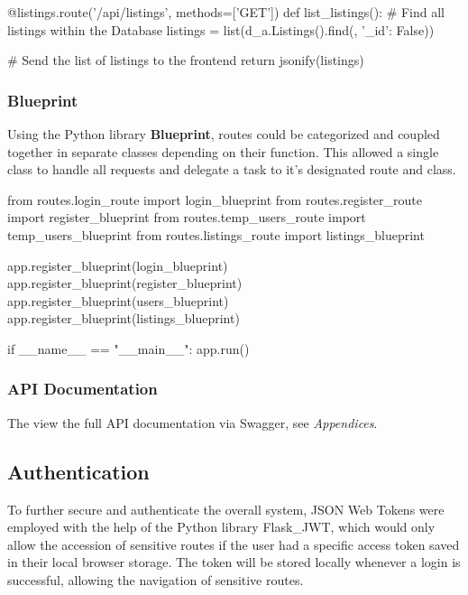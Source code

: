 \begin{python}[caption=API Counterpart Route]
@listings.route('/api/listings', methods=['GET'])
def list_listings():
    # Find all listings within the Database
    listings = list(d_a.Listings().find({}, {'_id': False}))
    
    # Send the list of listings to the frontend
    return jsonify(listings)
\end{python}

\subsubsection{Blueprint}
Using the Python library \textbf{Blueprint}, routes could be categorized and coupled together in separate classes depending on their function. This allowed a single class to handle all requests and delegate a task to it's designated route and class. \newline

\begin{python}[caption=Main Flask Runner]
from routes.login_route import login_blueprint 
from routes.register_route import register_blueprint
from routes.temp_users_route import temp_users_blueprint
from routes.listings_route import listings_blueprint

app.register_blueprint(login_blueprint) 
app.register_blueprint(register_blueprint)
app.register_blueprint(users_blueprint)
app.register_blueprint(listings_blueprint)

if __name__ == "__main__":
    app.run() 
\end{python}

\subsubsection{API Documentation}
The view the full API documentation via Swagger, see \textit{Appendices}. 

\subsection{Authentication}
To further secure and authenticate the overall system, JSON Web Tokens were employed with the help of the Python library Flask\_JWT, which would only allow the accession of sensitive routes if the user had a specific access token saved in their local browser storage. The token will be stored locally whenever a login is successful, allowing the navigation of sensitive routes.  \newline

